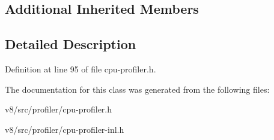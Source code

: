 \subsection*{Additional Inherited Members}


\subsection{Detailed Description}


Definition at line 95 of file cpu-\/profiler.\+h.



The documentation for this class was generated from the following files\+:\begin{DoxyCompactItemize}
\item 
v8/src/profiler/cpu-\/profiler.\+h\item 
v8/src/profiler/cpu-\/profiler-\/inl.\+h\end{DoxyCompactItemize}
